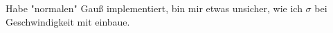 \subsection{}
\subsection{}
Habe "normalen" Gauß implementiert, bin mir etwas unsicher, wie ich $\sigma$ bei Geschwindigkeit mit einbaue.